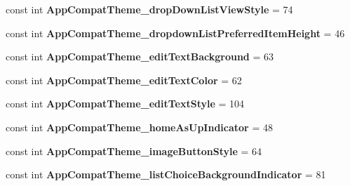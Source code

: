 \begin{DoxyCompactItemize}
\mbox{\label{class_pinned_app_1_1_droid_1_1_resource_1_1_styleable_a392a026e514563561d598b4ed7441283}} 
const int {\bfseries App\+Compat\+Theme\+\_\+drop\+Down\+List\+View\+Style} = 74
\item 
\mbox{\label{class_pinned_app_1_1_droid_1_1_resource_1_1_styleable_ad875d4dd970166aebff6540c7700cbc8}} 
const int {\bfseries App\+Compat\+Theme\+\_\+dropdown\+List\+Preferred\+Item\+Height} = 46
\item 
\mbox{\label{class_pinned_app_1_1_droid_1_1_resource_1_1_styleable_a7771228d409fc3ef64583dcf401fa193}} 
const int {\bfseries App\+Compat\+Theme\+\_\+edit\+Text\+Background} = 63
\item 
\mbox{\label{class_pinned_app_1_1_droid_1_1_resource_1_1_styleable_a2449e3ada802b25b111447e9180b3ba4}} 
const int {\bfseries App\+Compat\+Theme\+\_\+edit\+Text\+Color} = 62
\item 
\mbox{\label{class_pinned_app_1_1_droid_1_1_resource_1_1_styleable_ae5ef5fdf16b7ea84840f1f1ba888fb18}} 
const int {\bfseries App\+Compat\+Theme\+\_\+edit\+Text\+Style} = 104
\item 
\mbox{\label{class_pinned_app_1_1_droid_1_1_resource_1_1_styleable_ae37e2116e499decbbf2c5256edc480fa}} 
const int {\bfseries App\+Compat\+Theme\+\_\+home\+As\+Up\+Indicator} = 48
\item 
\mbox{\label{class_pinned_app_1_1_droid_1_1_resource_1_1_styleable_a9d1f3765f998258b1f47e4e5314282dc}} 
const int {\bfseries App\+Compat\+Theme\+\_\+image\+Button\+Style} = 64
\item 
\mbox{\label{class_pinned_app_1_1_droid_1_1_resource_1_1_styleable_a9559f181eb4354ccf0d035c5e52292bf}} 
const int {\bfseries App\+Compat\+Theme\+\_\+list\+Choice\+Background\+Indicator} = 81
\item 

\end{DoxyCompactItemize}
